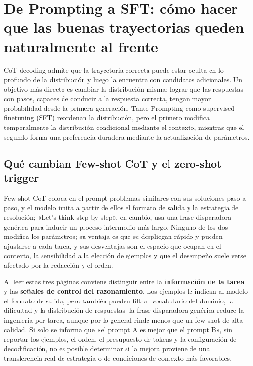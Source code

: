 \section{De Prompting a SFT: cómo hacer que las buenas trayectorias queden naturalmente al frente}

CoT decoding admite que la trayectoria correcta puede estar oculta en lo profundo de la distribución y luego la encuentra con candidatos adicionales. Un objetivo más directo es cambiar la distribución misma: lograr que las respuestas con pasos, capaces de conducir a la respuesta correcta, tengan mayor probabilidad desde la primera generación. Tanto Prompting como supervised finetuning (SFT) reordenan la distribución, pero el primero modifica temporalmente la distribución condicional mediante el contexto, mientras que el segundo forma una preferencia duradera mediante la actualización de parámetros.


\subsection{Qué cambian Few-shot CoT y el zero-shot trigger}

Few-shot CoT coloca en el prompt problemas similares con sus soluciones paso a paso, y el modelo imita a partir de ellos el formato de salida y la estrategia de resolución; «Let's think step by step», en cambio, usa una frase disparadora genérica para inducir un proceso intermedio más largo. Ninguno de los dos modifica los parámetros; su ventaja es que se despliegan rápido y pueden ajustarse a cada tarea, y sus desventajas son el espacio que ocupan en el contexto, la sensibilidad a la elección de ejemplos y que el desempeño suele verse afectado por la redacción y el orden.




Al leer estas tres páginas conviene distinguir entre la \textbf{información de la tarea} y las \textbf{señales de control del razonamiento}. Los ejemplos le indican al modelo el formato de salida, pero también pueden filtrar vocabulario del dominio, la dificultad y la distribución de respuestas; la frase disparadora genérica reduce la ingeniería por tarea, aunque por lo general rinde menos que un few-shot de alta calidad. Si solo se informa que «el prompt A es mejor que el prompt B», sin reportar los ejemplos, el orden, el presupuesto de tokens y la configuración de decodificación, no es posible determinar si la mejora proviene de una transferencia real de estrategia o de condiciones de contexto más favorables.

